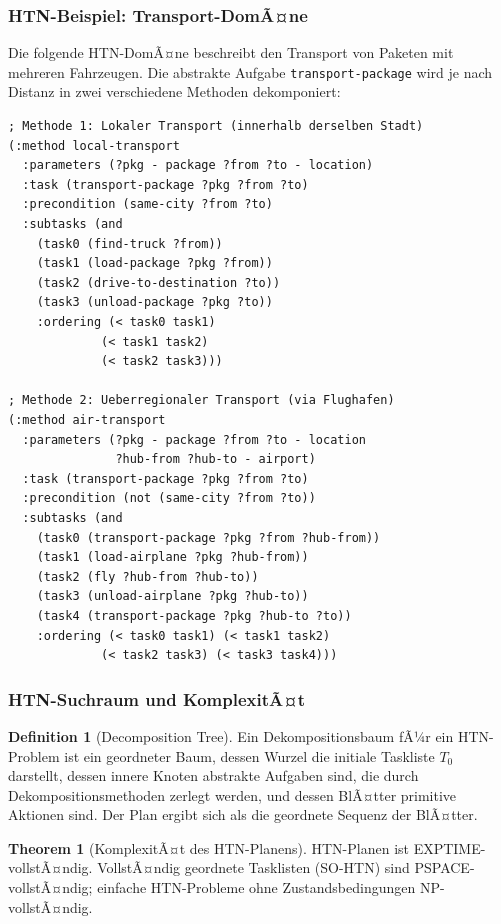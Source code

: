 ﻿\documentclass[a4paper,12pt]{article}
\theoremstyle{definition}
\newtheorem{definition}{Definition}[section]
\newtheorem{theorem}{Theorem}[section]
\begin{document}
\subsubsection{HTN-Beispiel: Transport-DomÃ¤ne}

Die folgende HTN-DomÃ¤ne beschreibt den Transport von Paketen mit mehreren Fahrzeugen. Die abstrakte Aufgabe \texttt{transport-package} wird je nach Distanz in zwei verschiedene Methoden dekomponiert:

\begin{lstlisting}[language=PDDL, caption=HTN-Methoden fÃ¼r Transport-DomÃ¤ne]
; Methode 1: Lokaler Transport (innerhalb derselben Stadt)
(:method local-transport
  :parameters (?pkg - package ?from ?to - location)
  :task (transport-package ?pkg ?from ?to)
  :precondition (same-city ?from ?to)
  :subtasks (and
    (task0 (find-truck ?from))
    (task1 (load-package ?pkg ?from))
    (task2 (drive-to-destination ?to))
    (task3 (unload-package ?pkg ?to))
    :ordering (< task0 task1)
             (< task1 task2)
             (< task2 task3)))

; Methode 2: Ueberregionaler Transport (via Flughafen)
(:method air-transport
  :parameters (?pkg - package ?from ?to - location
               ?hub-from ?hub-to - airport)
  :task (transport-package ?pkg ?from ?to)
  :precondition (not (same-city ?from ?to))
  :subtasks (and
    (task0 (transport-package ?pkg ?from ?hub-from))
    (task1 (load-airplane ?pkg ?hub-from))
    (task2 (fly ?hub-from ?hub-to))
    (task3 (unload-airplane ?pkg ?hub-to))
    (task4 (transport-package ?pkg ?hub-to ?to))
    :ordering (< task0 task1) (< task1 task2)
             (< task2 task3) (< task3 task4)))
\end{lstlisting}

\subsubsection{HTN-Suchraum und KomplexitÃ¤t}

\begin{definition}[Decomposition Tree]
Ein Dekompositionsbaum fÃ¼r ein HTN-Problem ist ein geordneter Baum, dessen Wurzel die initiale Taskliste $T_0$ darstellt, dessen innere Knoten abstrakte Aufgaben sind, die durch Dekompositionsmethoden zerlegt werden, und dessen BlÃ¤tter primitive Aktionen sind. Der Plan ergibt sich als die geordnete Sequenz der BlÃ¤tter.
\end{definition}

\begin{theorem}[KomplexitÃ¤t des HTN-Planens]
HTN-Planen ist EXPTIME-vollstÃ¤ndig. VollstÃ¤ndig geordnete Tasklisten (SO-HTN) sind PSPACE-vollstÃ¤ndig; einfache HTN-Probleme ohne Zustandsbedingungen NP-vollstÃ¤ndig.
\end{theorem}
\end{document}
